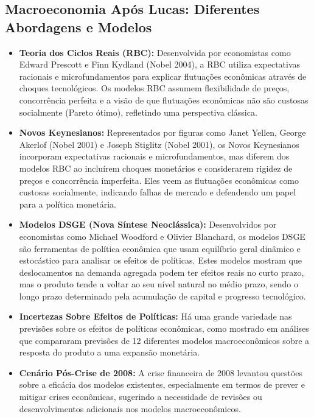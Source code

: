 \documentclass[a4paper,12pt]{article}[abntex2]
\begin{document}
\subsection{Macroeconomia Após Lucas: Diferentes Abordagens e Modelos}
\begin{itemize}
  \item \textbf{Teoria dos Ciclos Reais (RBC):} Desenvolvida por economistas como Edward Prescott e Finn Kydland (Nobel 2004), a RBC utiliza expectativas racionais e microfundamentos para explicar flutuações econômicas através de choques tecnológicos. Os modelos RBC assumem flexibilidade de preços, concorrência perfeita e a visão de que flutuações econômicas não são custosas socialmente (Pareto ótimo), refletindo uma perspectiva clássica.

  \item \textbf{Novos Keynesianos:} Representados por figuras como Janet Yellen, George Akerlof (Nobel 2001) e Joseph Stiglitz (Nobel 2001), os Novos Keynesianos incorporam expectativas racionais e microfundamentos, mas diferem dos modelos RBC ao incluírem choques monetários e considerarem rigidez de preços e concorrência imperfeita. Eles veem as flutuações econômicas como custosas socialmente, indicando falhas de mercado e defendendo um papel para a política monetária.

  \item \textbf{Modelos DSGE (Nova Síntese Neoclássica):} Desenvolvidos por economistas como Michael Woodford e Olivier Blanchard, os modelos DSGE são ferramentas de política econômica que usam equilíbrio geral dinâmico e estocástico para analisar os efeitos de políticas. Estes modelos mostram que deslocamentos na demanda agregada podem ter efeitos reais no curto prazo, mas o produto tende a voltar ao seu nível natural no médio prazo, sendo o longo prazo determinado pela acumulação de capital e progresso tecnológico.

  \item \textbf{Incertezas Sobre Efeitos de Políticas:} Há uma grande variedade nas previsões sobre os efeitos de políticas econômicas, como mostrado em análises que compararam previsões de 12 diferentes modelos macroeconômicos sobre a resposta do produto a uma expansão monetária.

  \item \textbf{Cenário Pós-Crise de 2008:} A crise financeira de 2008 levantou questões sobre a eficácia dos modelos existentes, especialmente em termos de prever e mitigar crises econômicas, sugerindo a necessidade de revisões ou desenvolvimentos adicionais nos modelos macroeconômicos.
\end{itemize}
\end{document}
